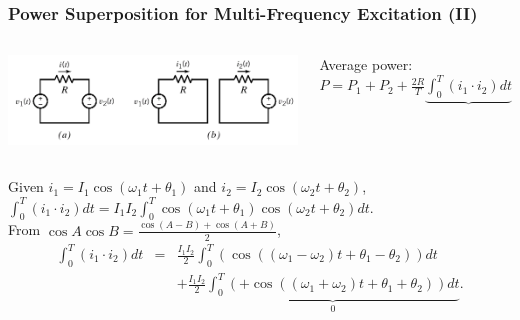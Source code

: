 \documentclass{beamer}
\begin{document}
\begin{frame}[fragile]
\frametitle{Power Superposition for Multi-Frequency Excitation (II)}

\begin{columns}[c]

\includegraphics[width=\textwidth]{src/super1.png}

Average power: 
$P = P_1 + P_2 + \frac{2 R}{T} \underbrace{\int_{0}^T (i_1 \cdot i_2) dt}$

\end{columns}

Given $i_1 = I_1 \cos(\omega_1 t + \theta_1)$
and $i_2 = I_2 \cos(\omega_2 t + \theta_2)$,
$\int_{0}^T (i_1 \cdot i_2) dt
= I_1 I_2 \int_{0}^T \cos(\omega_1 t + \theta_1) \cos(\omega_2 t + \theta_2) dt$.
\\

\vspace{0.5cm}
From $\cos A \cos B = \frac{\cos(A-B) + \cos(A+B)}{2}$,
\begin{eqnarray}
\int_{0}^T (i_1 \cdot i_2) dt
&=& \frac{I_1 I_2}{2} \int_{0}^T \left(
\cos( (\omega_1 - \omega_2) t + \theta_1 - \theta_2) 
\right) dt
\nonumber \\
&\;&
+
\frac{I_1 I_2}{2} \underbrace{\int_{0}^T \left(
+ \cos( (\omega_1 + \omega_2) t + \theta_1 + \theta_2) 
\right) dt}_{0}
\nonumber .
\end{eqnarray}

\end{frame}

\end{document}
